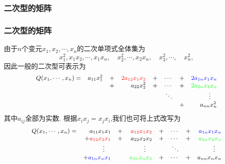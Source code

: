 \subsubsection{二次型的矩阵}
\begin{frame}\frametitle{二次型的矩阵}
由于$n$个变元$x_1,x_2,\cdots,x_n$的二次单项式全体集为
\[x_1^2,x_1x_2,\cdots,x_1x_n,\quad x_2^2,\cdots,x_2x_n,\quad x_3^2, \cdots, \quad x_n^2,\]
\pp
因此一般的二次型可表示为
\begin{equation*}\small
\begin{array}{rrrrrrrr}
Q(x_1,\cdots,x_n)=
&a_{11}x_1^2 &+& \red{2a_{12}x_1x_2} &+& \cdots &+& \blue{2a_{1n}x_1x_n}\\
&            &+& a_{22}x_2^2  &+& \cdots &+& \green{2a_{2n}x_2x_n}\\
&            & &               & & \ddots & & \vdots\quad \\
&            & &               & &        &+& a_{nn}x_n^2\\
\end{array}
\end{equation*}
其中$a_{ij}$全部为实数.
\pp
根据$x_ix_j=x_jx_i$,我们也可将上式改写为
\begin{equation*}\small
\begin{array}{rrrrrrrr}
Q(x_1,\cdots,x_n)=
&  a_{11}x_1x_1 &+&  \red{a_{12}x_1x_2} &+& \cdots &+& \blue{a_{1n}x_1x_n}\\
& +\red{a_{12}x_2x_1} &+&  a_{22}x_2x_2 &+& \cdots &+& \green{a_{2n}x_2x_n}\\
&   \vdots\quad & &   \vdots\quad & & \ddots & &   \vdots\quad\\
& +\blue{a_{1n}x_nx_1} & &  \green{a_{2n}x_nx_2} &+& \cdots &+& a_{nn}x_nx_n\\
\end{array}
\end{equation*}
\end{frame}





